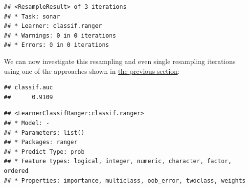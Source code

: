 \documentclass[]{scrbook}
\newenvironment{Shaded}{\begin{snugshade}}{\end{snugshade}}
\newcommand{\CommentTok}[1]{\textcolor[rgb]{0.56,0.35,0.01}{\textit{#1}}}
\newcommand{\DecValTok}[1]{\textcolor[rgb]{0.00,0.00,0.81}{#1}}
\newcommand{\KeywordTok}[1]{\textcolor[rgb]{0.13,0.29,0.53}{\textbf{#1}}}
\newcommand{\NormalTok}[1]{#1}
\newcommand{\OperatorTok}[1]{\textcolor[rgb]{0.81,0.36,0.00}{\textbf{#1}}}
\newcommand{\StringTok}[1]{\textcolor[rgb]{0.31,0.60,0.02}{#1}}
\renewenvironment{Shaded} {\begin{snugshade}\small} {\end{snugshade}}
\begin{document}
\begin{Shaded}
\end{Shaded}

\begin{verbatim}
## <ResampleResult> of 3 iterations
## * Task: sonar
## * Learner: classif.ranger
## * Warnings: 0 in 0 iterations
## * Errors: 0 in 0 iterations
\end{verbatim}

We can now investigate this resampling and even single resampling iterations using one of the approaches shown in \protect\hyperlink{bm-exec}{the previous section}:

\begin{Shaded}
\end{Shaded}

\begin{verbatim}
## classif.auc 
##      0.9109
\end{verbatim}

\begin{Shaded}
\end{Shaded}

\begin{verbatim}
## <LearnerClassifRanger:classif.ranger>
## * Model: -
## * Parameters: list()
## * Packages: ranger
## * Predict Type: prob
## * Feature types: logical, integer, numeric, character, factor, ordered
## * Properties: importance, multiclass, oob_error, twoclass, weights
\end{verbatim}
\end{document}
